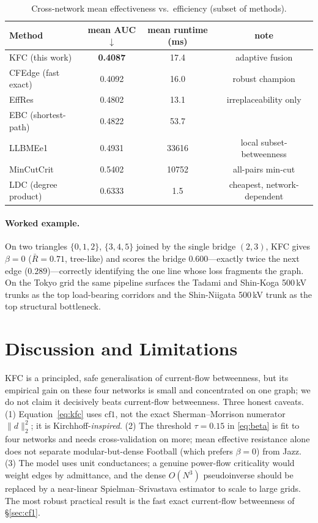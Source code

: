 \documentclass[11pt]{article}
\begin{document}
\begin{table}[t]
\centering
\small
\begin{tabular}{lccc}
\hline
Method & mean AUC $\downarrow$ & mean runtime (ms) & note \\
\hline
KFC (this work)        & \textbf{0.4087} & 17.4 & adaptive fusion \\
CFEdge (fast exact)    & 0.4092 & 16.0 & robust champion \\
EffRes                 & 0.4802 & 13.1 & irreplaceability only \\
EBC (shortest-path)    & 0.4822 & 53.7 & \\
LLBMEe1                & 0.4931 & 33616 & local subset-betweenness \\
MinCutCrit             & 0.5402 & 10752 & all-pairs min-cut \\
LDC (degree product)   & 0.6333 & 1.5  & cheapest, network-dependent \\
\hline
\end{tabular}
\caption{Cross-network mean effectiveness vs.\ efficiency (subset of methods).}
\label{tab:res}
\end{table}

\paragraph{Worked example.} On two triangles $\{0,1,2\}$, $\{3,4,5\}$ joined by the
single bridge $(2,3)$, KFC gives $\beta=0$ ($\bar R = 0.71$, tree-like) and scores the
bridge $0.600$---exactly twice the next edge ($0.289$)---correctly identifying the one
line whose loss fragments the graph. On the Tokyo grid the same pipeline surfaces the
Tadami and Shin-Koga 500\,kV trunks as the top load-bearing corridors and the
Shin-Niigata 500\,kV trunk as the top structural bottleneck.

\section{Discussion and Limitations}
KFC is a principled, safe generalisation of current-flow betweenness, but its empirical
gain on these four networks is small and concentrated on one graph; we do not claim it
decisively beats current-flow betweenness. Three honest caveats. (1) Equation~\eqref{eq:kfc}
uses $\mathrm{cf1}$, not the exact Sherman--Morrison numerator $\lVert d\rVert_2^2$; it is
Kirchhoff-\emph{inspired}. (2) The threshold $\tau=0.15$ in \eqref{eq:beta} is fit to
four networks and needs cross-validation on more; mean effective resistance alone does
not separate modular-but-dense Football (which prefers $\beta=0$) from Jazz. (3) The
model uses unit conductances; a genuine power-flow criticality would weight edges by
admittance, and the dense $O(N^3)$ pseudoinverse should be replaced by a near-linear
Spielman--Srivastava estimator to scale to large grids. The most robust practical result
is the fast exact current-flow betweenness of \S\ref{sec:cf1}.
\end{document}
